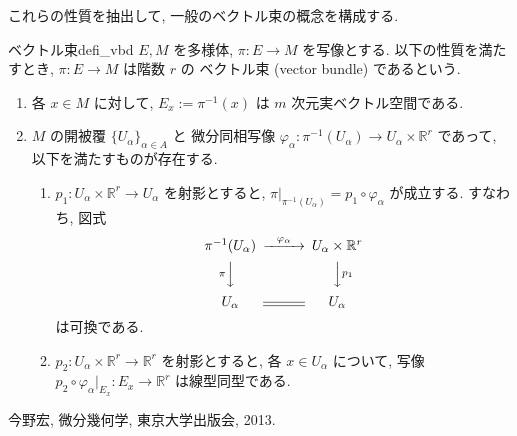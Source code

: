 \documentclass[a4paper,11pt]{ltjsarticle} %
\begin{document}
  これらの性質を抽出して, 一般のベクトル束の概念を構成する. 

  \begin{defi}{ベクトル束}{defi_vbd}
    \( E, M \) を多様体, \( \pi: E \to M \) を写像とする. 
    以下の性質を満たすとき, \( \pi: E \to M \) は階数 \( r \) の
    ベクトル束 (vector bundle) であるという. 
    \begin{enumerate}
    \item 各 \( x \in M \) に対して, \( E_x := \pi^{-1} (x) \) は
      \( m \) 次元実ベクトル空間である. 
    \item \( M \) の開被覆 \( \{U_{\alpha}\}_{\alpha \in A} \) と 
      微分同相写像 \( \varphi_{\alpha} : \pi^{-1} (U_{\alpha}) 
      \to U_{\alpha} \times \mathbb{R}^r \) であって, 
      以下を満たすものが存在する. 
    \begin{enumerate}
    \item \( p_1: U_{\alpha} \times \mathbb{R}^r \to U_{\alpha}\)
      を射影とすると, \( \pi |_{\pi^{-1} (U_{\alpha})} 
      = p_1 \circ \varphi_{\alpha} \) が成立する. すなわち, 図式
      \[
      \begin{CD}
      \pi^{-1} (U_{\alpha}) @>{\varphi_{\alpha}}>> U_{\alpha} \times \mathbb{R}^r \\
      @V{\pi}VV    @VV{p_1}V \\
      U_{\alpha}   @=  U_{\alpha}
      \end{CD}
      \]
      は可換である.
    \item \( p_2: U_{\alpha} \times \mathbb{R}^r \to \mathbb{R}^r \)
      を射影とすると, 各 \( x \in U_{\alpha} \) について, 写像
      \( p_2 \circ \varphi_{\alpha} |_{E_x} : 
      E_x \to \mathbb{R}^r \) は線型同型である. 
    \end{enumerate}
    \end{enumerate}
  \end{defi}

  \begin{thebibliography}{9}
    \item 今野宏, 微分幾何学, 東京大学出版会, 2013.
  \end{thebibliography}
\end{document}
